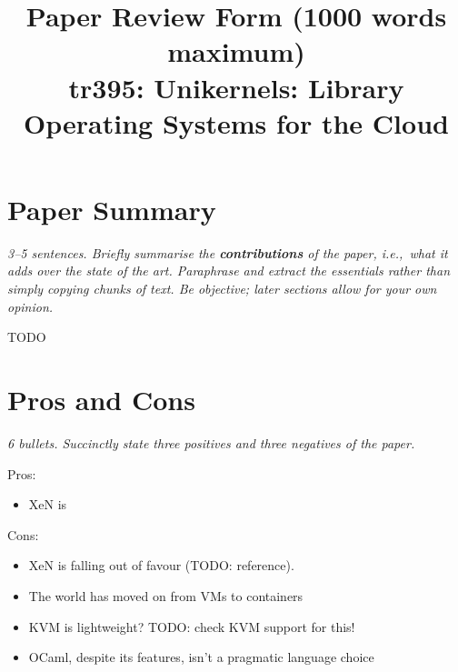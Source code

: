 \documentclass[11pt]{article}
\begin{document}
\title{Paper Review Form (1000 words maximum)\\
    tr395: Unikernels: Library Operating Systems for the Cloud \cite{Unikernels}}

\maketitle

\section*{Paper Summary}

\textsl{3--5 sentences. Briefly summarise the {\bf contributions} of the paper,
i.e.,~what it adds over the state of the art. Paraphrase and extract the
essentials rather than simply copying chunks of text. Be objective; later
sections allow for your own opinion.}

TODO


\section*{Pros and Cons}

\textsl{6 bullets. Succinctly state three positives and three negatives of the
paper.}

Pros:

\begin{itemize}

    \item XeN is

\end{itemize}

Cons:

\begin{itemize}

    \item XeN is falling out of favour (TODO: reference).



    \item The world has moved on from VMs to containers

    \item KVM is lightweight? TODO: check KVM support for this!

    \item OCaml, despite its features, isn't a pragmatic language choice

\end{itemize}
\end{document}

